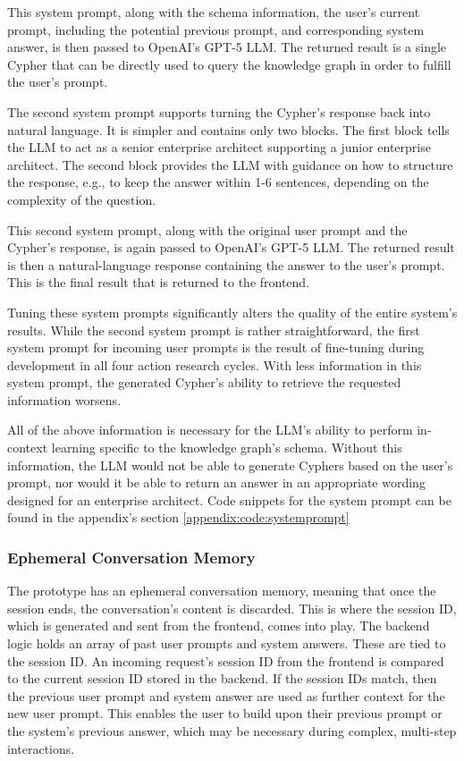 This system prompt, along with the schema information, the user's current prompt, including the potential previous prompt, and corresponding system answer, is then passed to OpenAI's GPT-5 LLM. The returned result is a single Cypher that can be directly used to query the knowledge graph in order to fulfill the user's prompt.

The second system prompt supports turning the Cypher's response back into natural language. It is simpler and contains only two blocks. The first block tells the LLM to act as a senior enterprise architect supporting a junior enterprise architect. The second block provides the LLM with guidance on how to structure the response, e.g., to keep the answer within 1-6 sentences, depending on the complexity of the question.

This second system prompt, along with the original user prompt and the Cypher's response, is again passed to OpenAI's GPT-5 LLM. The returned result is then a natural-language response containing the answer to the user's prompt. This is the final result that is returned to the frontend.

Tuning these system prompts significantly alters the quality of the entire system's results. While the second system prompt is rather straightforward, the first system prompt for incoming user prompts is the result of fine-tuning during development in all four action research cycles. With less information in this system prompt, the generated Cypher's ability to retrieve the requested information worsens.

All of the above information is necessary for the LLM's ability to perform in-context learning specific to the knowledge graph's schema. Without this information, the LLM would not be able to generate Cyphers based on the user's prompt, nor would it be able to return an answer in an appropriate wording designed for an enterprise architect. Code snippets for the system prompt can be found in the appendix's section \ref{appendix:code:systemprompt}

\subsubsection{Ephemeral Conversation Memory}
\label{sub:prompt}
The prototype has an ephemeral conversation memory, meaning that once the session ends, the conversation's content is discarded. \cite{zeppieri2025mmag} This is where the session ID, which is generated and sent from the frontend, comes into play. The backend logic holds an array of past user prompts and system answers. These are tied to the session ID. An incoming request's session ID from the frontend is compared to the current session ID stored in the backend. If the session IDs match, then the previous user prompt and system answer are used as further context for the new user prompt. This enables the user to build upon their previous prompt or the system's previous answer, which may be necessary during complex, multi-step interactions. \cite{zeppieri2025mmag}

